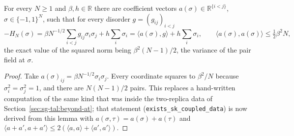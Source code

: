 \begin{lemma}\label{lem:sg-tal:sk-linear-data}
  \leanok
{}
For every $N\ge1$ and $\beta,h\in\mathbb R$ there are coefficient vectors $a(\sigma)\in\mathbb R^{\{i<j\}}$, $\sigma\in\{-1,1\}^N$, such that for every disorder $g=(g_{ij})_{i<j}$
\[
-H_N(\sigma)=\beta N^{-1/2}\sum_{i<j}g_{ij}\sigma_i\sigma_j+h\sum_i\sigma_i=\langle a(\sigma),g\rangle+h\sum_i\sigma_i,\qquad \langle a(\sigma),a(\sigma)\rangle\le \tfrac12\beta^2N ,
\]
the exact value of the squared norm being $\beta^2(N-1)/2$, the variance of the pair field at $\sigma$.
\end{lemma}
\begin{proof}
  \leanok
Take $a(\sigma)_{ij}=\beta N^{-1/2}\sigma_i\sigma_j$. Every coordinate squares to $\beta^2/N$ because $\sigma_i^2=\sigma_j^2=1$, and there are $N(N-1)/2$ pairs.
This replaces a hand-written computation of the same kind that was inside the two-replica data of Section~\ref{sec:sg-tal:beyond-at}; that statement (\texttt{exists\_sk\_coupled\_data}) is now derived from this lemma with $a(\sigma,\tau)=a(\sigma)+a(\tau)$ and $\langle a+a',a+a'\rangle\le2(\langle a,a\rangle+\langle a',a'\rangle)$.
\end{proof}

